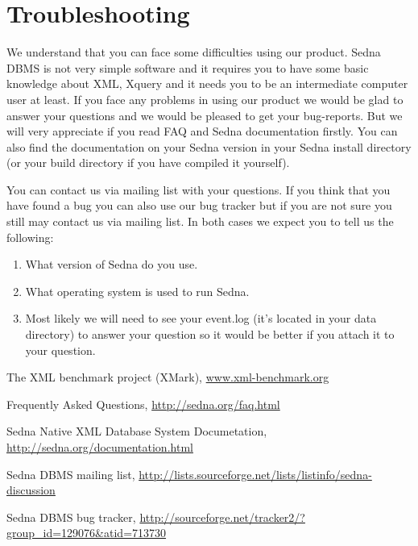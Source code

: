 \documentclass[a4paper,12pt]{article}
\begin{document}
\section{Troubleshooting}
\label{sec:troubleshooting}

We understand that you can face some difficulties using our product. Sedna DBMS is
not very simple software and it requires you to have some basic knowledge about XML,
Xquery and it needs you to be an intermediate computer user at least. If you face any
problems in using our product we would be glad to answer your questions and we would
be pleased to get your bug-reports. But we will very appreciate if you read FAQ\cite{link:FAQ}
and Sedna documentation\cite{link:Documentation} firstly. You can also find the documentation
on your Sedna version in your Sedna install directory (or your build directory if you
have compiled it yourself).


You can contact us via mailing list\cite{link:mailing-list} with your questions. If you
think that you have found a bug you can also use our bug tracker\cite{link:bug-tracker}
but if you are not sure you still may contact us via mailing list. In both cases we expect
you to tell us the following:

\begin{enumerate}
\item What version of Sedna do you use.
\item What operating system is used to run Sedna.
\item Most likely we will need to see your event.log (it's located in your data directory) to
answer your question so it would be better if you attach it to your question.
\end{enumerate}



\begin{thebibliography}{9}
 The XML benchmark project (XMark), \url{www.xml-benchmark.org}

Frequently Asked Questions,
\url{http://sedna.org/faq.html}

Sedna Native XML Database System Documetation,
\url{http://sedna.org/documentation.html}

Sedna DBMS mailing list,
\url{http://lists.sourceforge.net/lists/listinfo/sedna-discussion}

Sedna DBMS bug tracker,
\url{http://sourceforge.net/tracker2/?group_id=129076&atid=713730}

\end{thebibliography}
\end{document}
